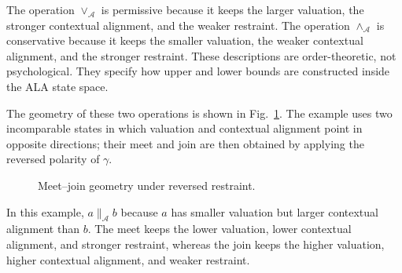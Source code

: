 \documentclass[reqno,final]{amsart}
\theoremstyle{definition}
\theoremstyle{plain}
\theoremstyle{remark}
\providecommand{\cA}{\mathcal{A}}
\providecommand{\parallelA}{\parallel_{\mathcal A}}
\providecommand{\meetA}{\wedge_{\mathcal A}}
\providecommand{\joinA}{\vee_{\mathcal A}}
\providecommand{\Pp}[3]{({#1+0.45*#2},{#3+0.28*#2})}
\providecommand{\ALAUnitCubeFrame}{%
  \draw[Ccube,dashed,thin] \Pp{0}{1}{0} -- \Pp{0}{0}{0};
  \draw[Ccube,dashed,thin] \Pp{0}{1}{0} -- \Pp{1}{1}{0};
  \draw[Ccube,dashed,thin] \Pp{0}{1}{0} -- \Pp{0}{1}{1};
  \draw[Ccube,thin] \Pp{0}{0}{0} -- \Pp{1}{0}{0};
  \draw[Ccube,thin] \Pp{0}{0}{0} -- \Pp{0}{0}{1};
  \draw[Ccube,thin] \Pp{1}{0}{0} -- \Pp{1}{1}{0};
  \draw[Ccube,thin] \Pp{1}{0}{0} -- \Pp{1}{0}{1};
  \draw[Ccube,thin] \Pp{1}{1}{0} -- \Pp{1}{1}{1};
  \draw[Ccube,thin] \Pp{0}{0}{1} -- \Pp{1}{0}{1};
  \draw[Ccube,thin] \Pp{0}{0}{1} -- \Pp{0}{1}{1};
  \draw[Ccube,thin] \Pp{1}{0}{1} -- \Pp{1}{1}{1};
  \draw[Ccube,thin] \Pp{0}{1}{1} -- \Pp{1}{1}{1};
}
\providecommand{\ALAUnitCubeAxes}{%
  \draw[Ctheta,-{Latex[length=2mm]},thick]
       \Pp{0}{0}{0} -- \Pp{1.05}{0}{0}
       node[below right,black,font=\footnotesize]{$\theta$ valuation};
  \draw[Csigma,-{Latex[length=2mm]},thick]
       \Pp{1}{0}{0} -- \Pp{1}{1.07}{0}
       node[right,black,font=\footnotesize]{$\sigma$ contextual alignment};
  \draw[Cgamma,-{Latex[length=2mm]},thick]
       \Pp{0}{0}{0} -- \Pp{0}{0}{1.07}
       node[left,black,font=\footnotesize]{$\gamma$ epistemic restraint};
}
\begin{document}
The operation \(\vee_{\cA}\) is permissive because it keeps the larger valuation, the stronger contextual alignment, and the weaker restraint. The operation \(\wedge_{\cA}\) is conservative because it keeps the smaller valuation, the weaker contextual alignment, and the stronger restraint. These descriptions are order-theoretic, not psychological. They specify how upper and lower bounds are constructed inside the ALA state space.

The geometry of these two operations is shown in Fig.~\ref{fig:meet-join-incomparability}. The example uses two incomparable states in which valuation and contextual alignment point in opposite directions; their meet and join are then obtained by applying the reversed polarity of \(\gamma\).


\begin{figure}[!htbp]
\centering
{}
\caption{Meet--join geometry under reversed restraint.}
\label{fig:meet-join-incomparability}
\end{figure}
In this example, \(a\parallelA b\) because \(a\) has smaller valuation but larger contextual alignment than \(b\). The meet keeps the lower valuation, lower contextual alignment, and stronger restraint, whereas the join keeps the higher valuation, higher contextual alignment, and weaker restraint.
\end{document}
